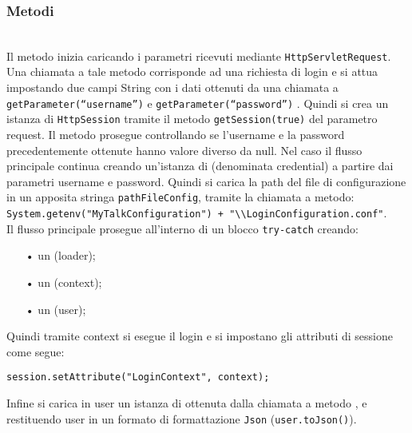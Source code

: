 \subsubsection*{Metodi}
\begin{description}
	\item{}\\

Il metodo inizia caricando i parametri ricevuti mediante \texttt{HttpServletRequest}. Una chiamata a tale metodo corrisponde ad una richiesta di login e si attua impostando due campi String con i dati ottenuti da una chiamata a \texttt{getParameter(``username'')} e \texttt{getParameter(``password'')} . Quindi si crea un istanza di \texttt{HttpSession} tramite il metodo \texttt{getSession(true)} del parametro request. Il metodo prosegue controllando se l'username e la password precedentemente ottenute hanno valore diverso da null. Nel caso il flusso principale continua creando un'istanza di  (denominata credential) a partire dai parametri username e password. Quindi si carica la path del file di configurazione in un apposita stringa \texttt{pathFileConfig}, tramite la chiamata a metodo:\\
	
\verb|System.getenv("MyTalkConfiguration") + "\\LoginConfiguration.conf"|.\\

Il flusso principale prosegue all'interno di un blocco \texttt{try-catch} creando:
	\begin{itemize}
		\item[•] un  (loader);
		\item[•] un  (context);
		\item[•] un  (user);
	\end{itemize}
Quindi tramite context si esegue il login e si impostano gli attributi di sessione come segue: 

\texttt{session.setAttribute("LoginContext", context);}

Infine si carica in user un istanza di  ottenuta dalla chiamata a metodo , e restituendo user in un formato di formattazione \texttt{Json} (\texttt{user.toJson()}).

\end{description}

